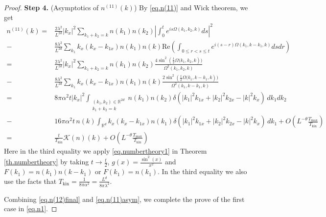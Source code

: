 \begin{proof}
\textbf{Step 4.} (Asymptotics of $n^{(11)}(k)$) By \eqref{eq.n(11)} and Wick theorem, we get 
\begin{equation}\label{eq.n(11)asym}
\begin{split}
    n^{(11)}(k)=&\frac{2\lambda^2}{L^{2d}} |k_x|^2\sum\limits_{k_1+k_2=k}n(k_1) n(k_2) \left|\int^{t}_0e^{i s\Omega(k_1,k_2,k)} ds\right|^2
    \\
    -&\frac{8\lambda^2}{L^{2d}}\sum_{k_1}k_x(k_x-k_{1x})n(k_1) n(k)\text{Re}\left(\int_{0\le r<s\le t} e^{i (s-r)\Omega(k_1,k-k_1,k)}  dsdr\right)
    \\
    =&\frac{2\lambda^2}{L^{2d}} |k_x|^2\sum\limits_{k_1+k_2=k}n(k_1) n(k_2) \frac{4\sin^2 \left(\frac{t}{2}\Omega(k_1,k_2,k\right))}{\Omega^2(k_1,k_2,k)}
    \\
    -&\frac{8\lambda^2}{L^{2d}}\sum_{k_1}k_x(k_x-k_{1x})n(k_1) n(k) \frac{2\sin^2 \left(\frac{t}{2}\Omega(k_1,k-k_1,k\right))}{\Omega^2(k_1,k-k_1,k)}
    \\
    =&8\pi \alpha^2t|k_x|^2\int_{\substack{(k_1, k_2)\in \mathbb{R}^{2d}\\k_1+k_2=k}}n(k_1) n(k_2)\delta(|k_1|^2k_{1x}+|k_2|^2k_{2x}-|k|^2k_{x})\, dk_1 dk_2
    \\
    -& 16\pi \alpha^2t\, n(k)\int_{\mathbb{R}^d}k_x(k_x-k_{1x})n(k_1) \delta(|k_1|^2k_{1x}+|k_2|^2k_{2x}-|k|^2k_{x})\, dk_1+O\left(L^{-\theta}\frac{T_{\text{max}}}{T_{\mathrm {kin}}}\right)
    \\
    =&\frac{t}{T_{\text{kin}}}\mathcal{K}(n)(k)+O\left(L^{-\theta}\frac{T_{\text{max}}}{T_{\mathrm {kin}}}\right)
\end{split}
\end{equation}
Here in the third equality we apply \eqref{eq.numbertheory1} in Theorem \ref{th.numbertheory} by taking $t\rightarrow\frac{t}{2}$, $g(x)=\frac{\sin^2(x)}{x^2}$ and $F(k_1)=n(k_1) n(k-k_1)$ or $F(k_1)=n(k_1)$. In the third equality we also use the facts that  $T_{\text{kin}}=\frac{1}{8\pi\alpha^2}=\frac{L^{d}}{8\pi\lambda^2}$.

Combining \eqref{eq.n(12)final} and \eqref{eq.n(11)asym}, we complete the prove of the first case in \eqref{eq.n1}.
\end{proof}
